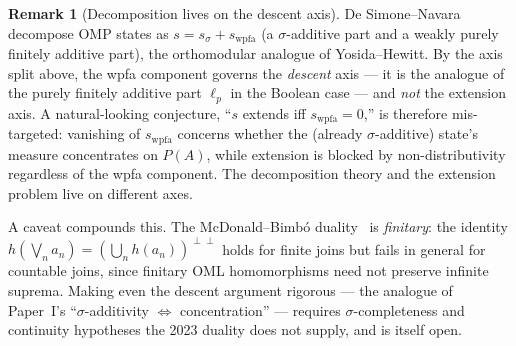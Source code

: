 \documentclass[11pt]{article}
\theoremstyle{definition}
\newtheorem{remark}[theorem]{Remark}
\begin{document}
\begin{remark}[Decomposition lives on the descent axis]
De Simone--Navara~\cite{DeSimoneNavara2001} decompose OMP states as
$s = s_\sigma + s_{\mathrm{wpfa}}$ (a $\sigma$-additive part and a
weakly purely finitely additive part), the orthomodular analogue of
Yosida--Hewitt.  By the axis split above, the wpfa component governs
the \emph{descent} axis --- it is the analogue of the purely finitely
additive part $\ell_p$ in the Boolean case --- and \emph{not} the
extension axis.  A natural-looking conjecture, ``$s$ extends iff
$s_{\mathrm{wpfa}} = 0$,'' is therefore mis-targeted: vanishing of
$s_{\mathrm{wpfa}}$ concerns whether the (already $\sigma$-additive)
state's measure concentrates on $P(A)$, while extension is blocked by
non-distributivity regardless of the wpfa component.  The
decomposition theory and the extension problem live on different
axes.

A caveat compounds this.  The McDonald--Bimb\'{o}
duality~\cite{McDonaldBimbo2023} is \emph{finitary}: the identity
$h(\bigvee_n a_n) = (\bigcup_n h(a_n))^{\perp\perp}$ holds for finite
joins but fails in general for countable joins, since finitary OML
homomorphisms need not preserve infinite suprema.  Making even the
descent argument rigorous --- the analogue of Paper~I's
``$\sigma$-additivity $\Leftrightarrow$ concentration'' --- requires
$\sigma$-completeness and continuity hypotheses the 2023 duality does
not supply, and is itself open.
\end{remark}
\end{document}
